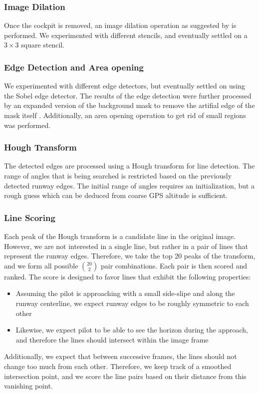 \documentclass[letterpaper, conference]{IEEEtran}  %
\begin{document}
\subsubsection{\textbf{Image Dilation}}
Once the cockpit is removed, an image dilation operation as suggested by \cite{Naidu2011} is performed. We experimented with different stencils, and eventually settled on a $3\times3$ square stencil.
\subsubsection{\textbf{Edge Detection and Area opening}}
We experimented with different edge detectors, but eventually settled on using the Sobel edge detector. The results of the edge detection were further processed by an expanded version of the background mask to remove the artifial edge of the mask itself . Additionally, an area opening operation to get rid of small regions was performed.
\subsubsection{\textbf{Hough Transform}}
The detected edges are processed using a Hough transform for line detection. The range of angles that is being searched is restricted based on the previously detected runway edges. The initial range of angles requires an initialization, but a rough guess which can be deduced from coarse GPS altitude is sufficient.
\subsubsection{\textbf{Line Scoring}} 
\label{sec:pipeline:score}
Each peak of the Hough transform is a candidate line in the original image. However, we are not interested in a single line, but rather in a pair of lines that represent the runway edges. Therefore, we take the top 20 peaks of the transform, and we form all possible $\binom{20}{2}$ pair combinations. Each pair is then scored and ranked. The score is designed to favor lines that exhibit the following properties:
\begin{itemize}
\item Assuming the pilot is approaching with a small side-slipe and along the runway centerline, we expect runway edges to be roughly symmetric to each other
\item Likewise, we expect pilot to be able to see the horizon during the approach, and therefore the lines should intersect within the image frame
\end{itemize}
Additionally, we expect that between successive frames, the lines should not change too much from each other. Therefore, we keep track of a smoothed intersection point, and we score the line pairs based on their distance from this vanishing point.
\end{document}
